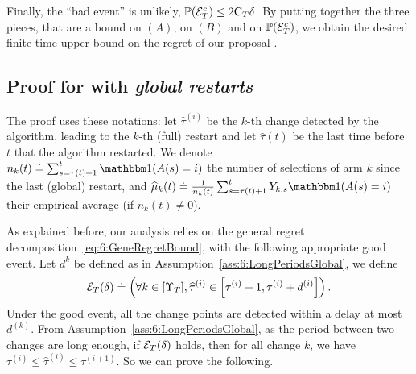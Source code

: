 Finally, the ``bad event'' is unlikely, $\mathbb{P}(\mathcal{E}_T^c) \leq 2\mathrm{C}_T \delta$.
By putting together the three pieces, that are a bound on $(A)$, on $(B)$ and on $\mathbb{P}(\mathcal{E}_T^c)$, we obtain the desired finite-time upper-bound on the regret of our proposal \GLRklUCB.





\subsection{Proof for \GLRklUCB{} with \emph{global restarts}}
\label{proof:6:mainRegretBoundGlobal}





The proof uses these notations:
let $\widehat{\tau}^{(i)}$ be the $k$-th change detected by the algorithm, leading to the $k$-th (full) restart and let $\widehat{\tau}(t)$ be the last time before $t$ that the algorithm restarted.
We denote $n_k(t) \eqdef \sum_{s=\tau(t)+1}^{t}\indic(A(s) = i)$ the number of selections of arm $k$ since the last (global) restart, and $\widehat{\mu}_k(t) \eqdef \frac{1}{n_k(t)}\sum_{s=\tau(t)+1}^{t}Y_{k,s}\indic(A(s) = i)$ their empirical average (if $n_k(t) \neq 0$).

As explained before, our analysis relies on the general regret decomposition~\eqref{eq:6:GeneRegretBound}, with the following appropriate good event. Let $d^k$ be defined as in Assumption~\ref{ass:6:LongPeriodsGlobal}, we define
\begin{equation}\label{def:6:GoodEvenGlobal}
    \mathcal{E}_T(\delta) \overset{.}{=} \left( \forall k \in [\Upsilon_T], \widehat{\tau}^{(i)} \in \left[\tau^{(i)} + 1, \tau^{(i)} + d^{(i)}\right] \right).
\end{equation}
Under the good event, all the change points are detected within a delay at most $d^(k)$.
%
From Assumption~\ref{ass:6:LongPeriodsGlobal}, as the period between two changes are long enough, if $\mathcal{E}_T(\delta)$ holds, then for all change $k$, we have $\tau^{(i)} \leq \widehat{\tau}^{(i)} \leq \tau^{(i+1)}$.
So we can prove the following.

